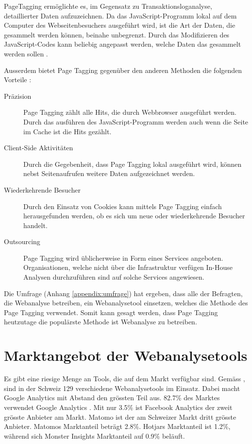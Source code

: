 PageTagging ermöglichte es, im Gegensatz zu Transaktionsloganalyse, detaillierter Daten aufzuzeichnen. Da das JavaScript-Programm lokal auf dem Computer des Webseitenbesuchers ausgeführt wird, ist die Art der Daten, die gesammelt werden können, beinahe unbegrenzt. Durch das Modifizieren des JavaScript-Codes kann beliebig angepasst werden, welche Daten das gesammelt werden sollen \parencite[S. 3]{waisberg2009webShort}. 

Ausserdem bietet Page Tagging gegenüber den anderen Methoden die folgenden Vorteile \parencite[S. 174]{nakatani2011toolselectionmethod}:

\begin{description}
  \item[Präzision] Page Tagging zählt alle Hits, die durch Webbrowser ausgeführt werden. Durch das ausführen des JavaScript-Programm werden auch wenn die Seite im Cache ist die Hits gezählt.
  \item[Client-Side Aktivitäten] Durch die Gegebenheit, dass Page Tagging lokal ausgeführt wird, können nebst Seitenaufrufen weitere Daten aufgezeichnet werden.
  \item[Wiederkehrende Besucher] Durch den Einsatz von Cookies kann mittels Page Tagging einfach herausgefunden werden, ob es sich um neue oder wiederkehrende Besucher handelt.
  \item[Outsourcing] Page Tagging wird üblicherweise in Form eines Services angeboten. Organisationen, welche nicht über die Infrastruktur verfügen In-House Analysen durchzuführen sind auf solche Services angewiesen.
\end{description}

Die Umfrage (Anhang \ref{appendix:umfrage}) hat ergeben, dass alle der Befragten, die Webanalyse betreiben, ein Webanalysetool einsetzen, welches die Methode des Page Tagging verwendet. Somit kann gesagt werden, dass Page Tagging heutzutage die populärste Methode ist Webanalyse zu betreiben.

\newpage
\section{Marktangebot der Webanalysetools}\label{sec:marktangebotwebanalyse}
Es gibt eine riesige Menge an Tools, die auf dem Markt verfügbar sind. Gemäss \parencite{datanyzeSwitzerlandWebanalytics}, sind in der Schweiz 129 verschiedene Webanalysetools im Einsatz. Dabei macht Google Analytics mit Abstand den grössten Teil aus. 82.7\% des Marktes verwendet Google Analytics . Mit nur 3.5\% ist Facebook Analytics der zweit grösste Anbieter am Markt. Matomo ist der am Schweizer Markt dritt grösste Anbieter. Matomos Marktanteil beträgt 2.8\%. Hotjars Marktanteil ist 1.2\%, während sich Monster Insights Marktanteil auf 0.9\% beläuft. 

